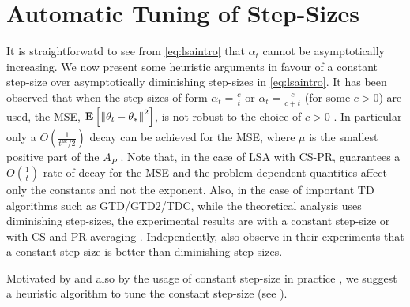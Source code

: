 \section{Automatic Tuning of Step-Sizes}
It is straightforwatd to see from \eqref{eq:lsaintro} that $\alpha_t$ cannot be asymptotically increasing. We now present some heuristic arguments in favour of a constant step-size over asymptotically diminishing step-sizes in \eqref{eq:lsaintro}.
It has been observed that when the step-sizes of form $\alpha_t=\frac{c}{t}$ or $\alpha_t=\frac{c}{c+t}$ (for some $c>0$) are used, the MSE, $\mathbf{E}\left[\left\| \theta_t-\theta_*\right\|^2\right]$, is not robust to the choice of $c>0$ \cite{korda-prashanth,bach-moulines}. In particular only a $O(\frac{1}{t^{\mu c}/2})$ decay can be achieved for the MSE, where $\mu$ is the smallest positive part of the $A_P$ \cite{bach-moulines}. Note that, in the case of LSA with CS-PR,  guarantees a $O(\frac{1}{t})$ rate of decay for the MSE and the problem dependent quantities affect only the constants and not the exponent. Also, in the case of important TD algorithms such as GTD/GTD2/TDC, while the theoretical analysis uses diminishing step-sizes, the experimental results are with a constant step-size or with CS and PR averaging \cite{gtd2,gtdmp}. Independently, \citet{dann} also observe in their experiments that a constant step-size is better than diminishing step-sizes.\par
Motivated by  and also by the usage of constant step-size in practice \cite{dann,gtd2,gtdmp}, we suggest a heuristic algorithm to tune the constant step-size (see ).

